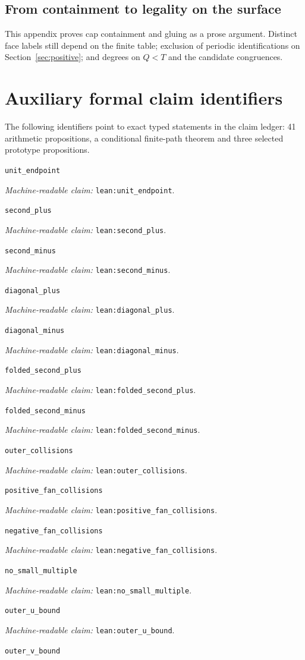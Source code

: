 \documentclass[11pt]{amsart}
\newcommand{\record}[1]{\nolinkurl{#1}}
\newcommand{\claimid}[1]{\par\nopagebreak\noindent\textit{Machine-readable claim:} \record{#1}.\par}
\begin{document}
\subsection{From containment to legality on the surface}
This appendix proves cap containment and gluing as a prose argument.
Distinct face labels still depend on the finite table; exclusion of
periodic identifications on Section~\ref{sec:positive}; and degrees on $Q<T$ and the
candidate congruences.

\section*{Auxiliary formal claim identifiers}
The following identifiers point to exact typed statements in the claim
ledger: 41 arithmetic propositions, a conditional finite-path theorem
and three selected prototype propositions.
\par\noindent\label{lean:unit_endpoint}\record{unit_endpoint}
\claimid{lean:unit_endpoint}
\par\noindent\label{lean:second_plus}\record{second_plus}
\claimid{lean:second_plus}
\par\noindent\label{lean:second_minus}\record{second_minus}
\claimid{lean:second_minus}
\par\noindent\label{lean:diagonal_plus}\record{diagonal_plus}
\claimid{lean:diagonal_plus}
\par\noindent\label{lean:diagonal_minus}\record{diagonal_minus}
\claimid{lean:diagonal_minus}
\par\noindent\label{lean:folded_second_plus}\record{folded_second_plus}
\claimid{lean:folded_second_plus}
\par\noindent\label{lean:folded_second_minus}\record{folded_second_minus}
\claimid{lean:folded_second_minus}
\par\noindent\label{lean:outer_collisions}\record{outer_collisions}
\claimid{lean:outer_collisions}
\par\noindent\label{lean:positive_fan_collisions}\record{positive_fan_collisions}
\claimid{lean:positive_fan_collisions}
\par\noindent\label{lean:negative_fan_collisions}\record{negative_fan_collisions}
\claimid{lean:negative_fan_collisions}
\par\noindent\label{lean:no_small_multiple}\record{no_small_multiple}
\claimid{lean:no_small_multiple}
\par\noindent\label{lean:outer_u_bound}\record{outer_u_bound}
\claimid{lean:outer_u_bound}
\par\noindent\label{lean:outer_v_bound}\record{outer_v_bound}
\end{document}
